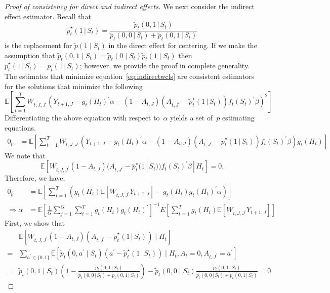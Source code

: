 \documentclass[12pt]{article}
\def\E{\mathbb{E}}
\def\given{\, | \,}
\begin{document}
\begin{proof}[Proof of consistency for direct and indirect effects]
We next consider the indirect effect estimator.  Recall that
$$
\tilde{p}^\star_t (1 \given S_t) = \frac{\tilde{p}_t (0,1 \given S_t)}{\tilde{p}_t (0,0 \given S_t)+\tilde{p}_t (0,1 \given S_t)}
$$
is the replacement for $\tilde p(1 \mid S_t)$ in the direct effect for centering.  If we make the assumption that $\tilde p_t (0,1 \mid S_t) = \tilde p_t (0 \mid S_t) \tilde p_t (1 \mid S_t)$ then $\tilde{p}^\star_t (1 \given S_t) = \tilde{p}_t (1 \given S_t)$; however, we provide the proof in complete generality. The estimates that minimize equation~\eqref{eq:indirectwcls} are consistent estimators for the solutions that minimize the following
\[
\E \left[ \sum_{t=1}^T W_{t,J, J^\prime} \left( Y_{t+1,J} - g_t(H_t)^\prime \alpha
-  (1-A_{t,J}) (A_{t,J^\prime} - \tilde{p}^\star_t (1 \given S_t) ) f_t (S_t)^\prime \beta \right)^2 \right]
\]
Differentiating the above equation with respect to~$\alpha$
yields a set of~$p$ estimating equations.
\begin{align*}
0_{p}&= \E \left[ \sum_{t=1}^T W_{t,J,J^\prime} \left( Y_{t+1,J} - g_t(H_t)^\prime \alpha
-  (1-A_{t,J}) (A_{t,J^\prime} - \tilde{p}_t^\star (1 \given S_t) ) f_t (S_t)^\prime \beta \right) g_t(H_t) \right]
\end{align*}
We note that
$$
\E \left[ W_{t,J, J^\prime} (1-A_{t,J}) (A_{t,J^\prime} - \tilde{p}_t^\star (1 \given S_t) )
f_t (S_t)^\prime \beta \given H_t \right] = 0.
$$
Therefore, we have,
\begin{align*}
0_{p}&= \E \left[ \sum_{t=1}^T (g_t(H_t) \E \left[ W_{t,J,J^\prime} Y_{t+1, J} \right] - g_t(H_t)  g_t(H_t)^\prime \alpha) \right] \\
\Rightarrow \alpha  &= \E \left[ \frac{1}{G} \sum_{j=1}^G \sum_{t=1}^T g_t(H_t)  g_t(H_t)^\prime  \right]^{-1} E \left[ \sum_{t=1}^T g_t(H_t) \E \left[ W_{t,J, J^\prime} Y_{t+1, J} \right] \right]
\end{align*}
First, we show that
\begin{align*}
&\E \left[ W_{t,J, J^\prime} (1-A_{t,J}) (A_{t,J^\prime} - \tilde{p}_t^\star (1 \given S_t) )
\mid H_t \right] \\
= &\sum_{a^\prime \in \{0,1\}} \E \left[ \tilde{p}_t (0,a^\prime \mid S_t)  (a^\prime - \tilde{p}_t^\star (1 \given S_t) )
\mid H_t, A_t = 0, A_{t,J^\prime} = a^\prime \right]\\
=& \tilde{p}_t (0,1 \mid S_t)  (1 - \frac{\tilde{p}_t (0,1 \given S_t)}{\tilde{p}_t (0,0 \given S_t)+\tilde{p}_t (0,1 \given S_t)} ) -  \tilde{p}_t (0,0 \mid S_t) \frac{\tilde{p}_t (0,1 \given S_t)}{\tilde{p}_t (0,0 \given S_t)+\tilde{p}_t (0,1 \given S_t)} = 0

\end{align*}
\end{proof}
\end{document}
